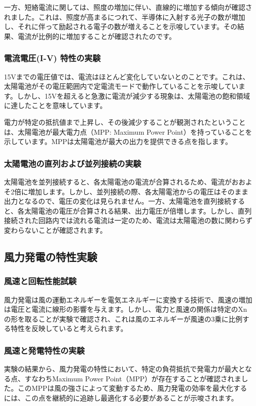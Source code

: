 \documentclass[a4paper,11pt,xelatex,ja=standard]{bxjsarticle}
\begin{document}
            一方、短絡電流に関しては、照度の増加に伴い、直線的に増加する傾向が確認されました。これは、照度が高まるにつれて、半導体に入射する光子の数が増加し、それに伴って励起される電子の数が増えることを示唆しています。その結果、電流が比例的に増加することが確認されたのです。
        \subsubsection{電流電圧(I-V) 特性の実験}
            15Vまでの電圧値では、電流はほとんど変化していないとのことです。これは、太陽電池がその電圧範囲内で定電流モードで動作していることを示唆しています。しかし、15Vを超えると急激に電流が減少する現象は、太陽電池の飽和領域に達したことを意味しています。
        
            電力が特定の抵抗値まで上昇し、その後減少することが観測されたということは、太陽電池が最大電力点（MPP: Maximum Power Point）を持っていることを示しています。MPPは太陽電池が最大の出力を提供できる点を指します。
        \subsubsection{太陽電池の直列および並列接続の実験}
            太陽電池を並列接続すると、各太陽電池の電流が合算されるため、電流がおおよそ2倍に増加します。しかし、並列接続の際、各太陽電池からの電圧はそのまま出力となるので、電圧の変化は見られません。一方、太陽電池を直列接続すると、各太陽電池の電圧が合算される結果、出力電圧が倍増します。しかし、直列接続された回路内では流れる電流は一定のため、電流は太陽電池の数に関わらず変わらないことが確認されます。
        
    \subsection{風力発電の特性実験}
        \subsubsection{風速と回転性能試験}
            風力発電は風の運動エネルギーを電気エネルギーに変換する技術で、風速の増加は電圧と電流に線形の影響を与えます。しかし、電力と風速の関係は特定のXnの形を取ることが実験で確認され、これは風のエネルギーが風速の3乗に比例する特性を反映していると考えられます。
        \subsubsection{風速と発電特性の実験}
            実験の結果から、風力発電の特性において、特定の負荷抵抗で発電力が最大となる点、すなわちMaximum Power Point（MPP）が存在することが確認されました。このMPPは風の強さによって変動するため、風力発電の効率を最大化するには、この点を継続的に追跡し最適化する必要があることが示唆されます。
\end{document}
